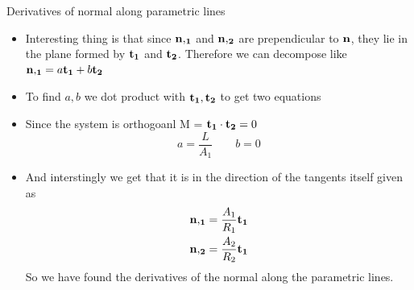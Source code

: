 	\begin{frame}{Derivatives of normal along parametric lines}
		\begin{itemize}
			\item Interesting thing is that since $\mathbf{n,_1}$ and $\mathbf{n,_2}$ are prependicular to $\mathbf{n}$, they lie in the plane formed by $\mathbf{t_1}$ and $\mathbf{t_2}$. Therefore we can decompose like $\mathbf{n,_1} =  a \mathbf{t_1} + b \mathbf{t_2}$
			\item To find $a,b$ we dot product with $\mathbf{t_1,t_2}$ to get two equations
			\item Since the system is orthogoanl M = $\mathbf{t_1\cdot t_2} = 0$
			\begin{equation}
			a = \frac{L}{A_1} \qquad b = 0
			\end{equation}			
			\item  And interstingly we get that it is in the direction of the tangents itself given as 
			\begin{equation}
			\begin{aligned}
				\mathbf{n,_1} = \frac{A_1}{R_1}\mathbf{t_1} \\				\mathbf{n,_2} = \frac{A_2}{R_2}\mathbf{t_1} \\
			\end{aligned}
			\end{equation}
			So we have found the derivatives of the normal along the parametric lines.
		\end{itemize}
	\end{frame}


